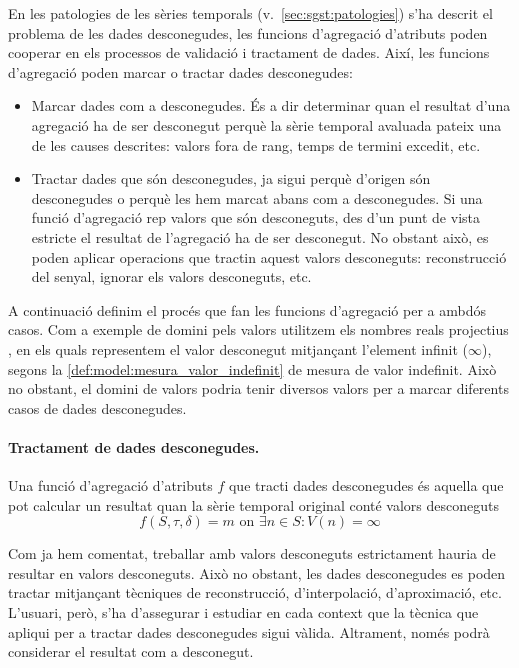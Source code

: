 En les patologies de les sèries temporals
(v.~\autoref{sec:sgst:patologies}) s'ha descrit el problema de les
dades desconegudes, les funcions d'agregació d'atributs poden cooperar
en els processos de validació i tractament de dades. Així, les
funcions d'agregació poden marcar o tractar dades desconegudes:
\begin{itemize}
\item Marcar dades com a desconegudes. És a dir determinar quan el
  resultat d'una agregació ha de ser desconegut perquè la sèrie
  temporal avaluada pateix una de les causes descrites: valors fora de
  rang, temps de termini excedit, etc.

\item Tractar dades que són desconegudes, ja sigui perquè d'origen són
  desconegudes o perquè les hem marcat abans com a desconegudes.
  Si una funció d'agregació rep valors que són desconeguts, des d'un
  punt de vista estricte el resultat de l'agregació ha de ser
  desconegut. No obstant això, es poden aplicar operacions que tractin
  aquest valors desconeguts: reconstrucció del senyal, ignorar els
  valors desconeguts, etc.
\end{itemize}

 
A continuació definim el procés que fan les funcions d'agregació per a
ambdós casos. Com a exemple de domini pels valors utilitzem els
nombres reals projectius , en els quals representem
el valor desconegut mitjançant l'element infinit ($\infty$), segons la
\autoref{def:model:mesura_valor_indefinit} de mesura de valor
indefinit. Això no obstant, el domini de valors podria tenir diversos
valors per a marcar diferents casos de dades desconegudes.

\paragraph{Tractament de dades desconegudes.}
Una funció d'agregació d'atributs $f$ que tracti dades
desconegudes és aquella que pot calcular un resultat quan la sèrie
temporal original conté valors desconeguts
\[
f(S,\tau,\delta)=m \text{ on } \exists n \in S: V(n)=\infty
\]

Com ja hem comentat, treballar amb valors desconeguts estrictament
hauria de resultar en valors desconeguts. Això no obstant, les dades
desconegudes es poden tractar mitjançant tècniques de reconstrucció,
d'interpolació, d'aproximació, etc. L'usuari, però, s'ha d'assegurar i
estudiar en cada context que la tècnica que apliqui per a tractar
dades desconegudes sigui vàlida. Altrament, només podrà considerar el
resultat com a desconegut.


